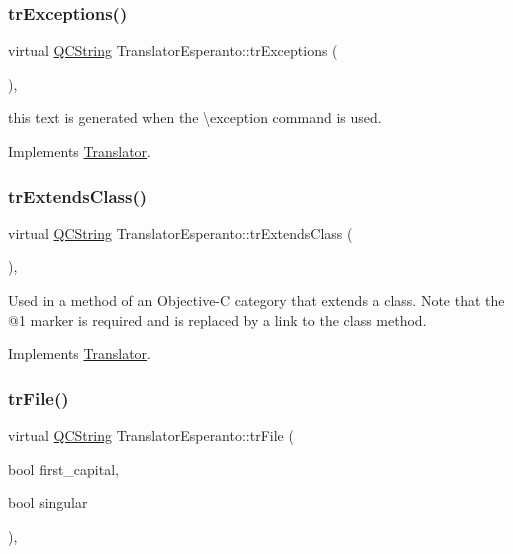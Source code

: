 \subsubsection{\texorpdfstring{trExceptions()}{trExceptions()}}
{\footnotesize\ttfamily virtual \mbox{\hyperlink{class_q_c_string}{Q\+C\+String}} Translator\+Esperanto\+::tr\+Exceptions (\begin{DoxyParamCaption}{ }\end{DoxyParamCaption})\hspace{0.3cm}{\ttfamily [inline]}, {\ttfamily [virtual]}}

this text is generated when the \textbackslash{}exception command is used. 

Implements \mbox{\hyperlink{class_translator}{Translator}}.

\mbox{\label{class_translator_esperanto_a0402120451d994d7d2eec8d50cd9ec7a}} 
\subsubsection{\texorpdfstring{trExtendsClass()}{trExtendsClass()}}
{\footnotesize\ttfamily virtual \mbox{\hyperlink{class_q_c_string}{Q\+C\+String}} Translator\+Esperanto\+::tr\+Extends\+Class (\begin{DoxyParamCaption}{ }\end{DoxyParamCaption})\hspace{0.3cm}{\ttfamily [inline]}, {\ttfamily [virtual]}}

Used in a method of an Objective-\/C category that extends a class. Note that the @1 marker is required and is replaced by a link to the class method. 

Implements \mbox{\hyperlink{class_translator}{Translator}}.

\mbox{\label{class_translator_esperanto_a36b38699194a3beda80339da0c4be51b}} 
\subsubsection{\texorpdfstring{trFile()}{trFile()}}
{\footnotesize\ttfamily virtual \mbox{\hyperlink{class_q_c_string}{Q\+C\+String}} Translator\+Esperanto\+::tr\+File (\begin{DoxyParamCaption}\item[{bool}]{first\+\_\+capital,  }\item[{bool}]{singular }\end{DoxyParamCaption})\hspace{0.3cm}{\ttfamily [inline]}, {\ttfamily [virtual]}}

